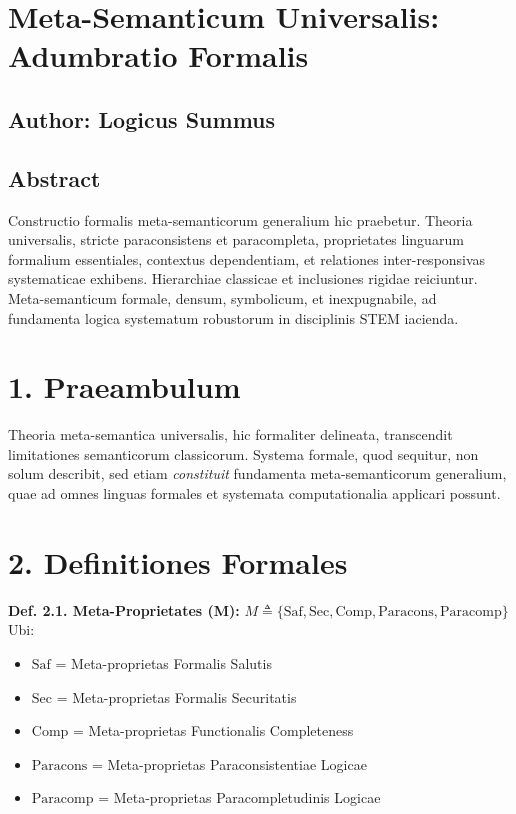 
	
	
	\section{Meta-Semanticum Universalis: Adumbratio Formalis}
	\label{sec:adumbratio}
	
	\subsection*{Author: Logicus Summus}
	
	\subsection*{Abstract}
	Constructio formalis meta-semanticorum generalium hic praebetur. Theoria universalis, stricte paraconsistens et paracompleta, proprietates linguarum formalium essentiales, contextus dependentiam, et relationes inter-responsivas systematicae exhibens. Hierarchiae classicae et inclusiones rigidae reiciuntur. Meta-semanticum formale, densum, symbolicum, et inexpugnabile, ad fundamenta logica systematum robustorum in disciplinis STEM iacienda.
	
	\section*{1. Praeambulum}
	Theoria meta-semantica universalis, hic formaliter delineata, transcendit limitationes semanticorum classicorum. Systema formale, quod sequitur, non solum describit, sed etiam \textit{constituit} fundamenta meta-semanticorum generalium, quae ad omnes linguas formales et systemata computationalia applicari possunt.
	
	\section*{2. Definitiones Formales}
	\textbf{Def. 2.1. Meta-Proprietates (M):}
	$M \triangleq \{ \text{Saf}, \text{Sec}, \text{Comp}, \text{Paracons}, \text{Paracomp} \}$
	Ubi:
	\begin{itemize}
		\item $\text{Saf}$ = Meta-proprietas Formalis Salutis
		\item $\text{Sec}$ = Meta-proprietas Formalis Securitatis
		\item $\text{Comp}$ = Meta-proprietas Functionalis Completeness
		\item $\text{Paracons}$ = Meta-proprietas Paraconsistentiae Logicae
		\item $\text{Paracomp}$ = Meta-proprietas Paracompletudinis Logicae
	\end{itemize}
	
